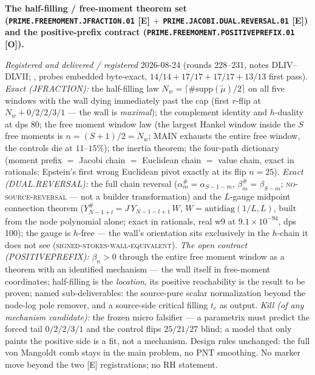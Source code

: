 \par\smallskip\noindent\textbf{The half-filling / free-moment
theorem set (\texttt{PRIME.FREEMOMENT.\allowbreak JFRACTION.01}
[E] $+$ \texttt{PRIME.JACOBI.DUAL.\allowbreak REVERSAL.01} [E])
and the positive-prefix contract
(\texttt{PRIME.FREEMOMENT.\allowbreak POSITIVEPREFIX.01} [O]).}
{\sloppy
\emph{Registered and delivered / registered} 2026-08-24 (rounds
228--231, notes DLIV--DLVII;
, probes
embedded byte-exact, $14/14 + 17/17 + 17/17 + 13/13$ first
pass).  \emph{Exact (JFRACTION):} the half-filling law $N_w =
\lceil \#\mathrm{supp}(\tilde\mu)/2 \rceil$ on all five windows
with the wall dying immediately past the cap (first $r$-flip at
$N_w + 0/2/2/3/1$ --- the wall is \emph{maximal}); the
complement identity and $h$-duality at dps 80; the free moment
window law (the largest Hankel window inside the $S$ free
moments is $n = (S+1)/2 = N_w$; MAIN exhausts the entire free
window, the controls die at $11$--$15\%$); the inertia theorem;
the four-path dictionary (moment prefix $=$ Jacobi chain $=$
Euclidean chain $=$ value chain, exact in rationals; Epstein's
first wrong Euclidean pivot exactly at its flip $n = 25$).
\emph{Exact (DUAL.REVERSAL):} the full chain reversal
($\alpha^{\#}_m = \alpha_{S-1-m}$, $\beta^{\#}_m =
\beta_{S-m}$; \textsc{no-source-reversal} --- not a builder
transformation) and the $L$-gauge midpoint connection theorem
($Y^{\#}_{N-1+l} = J\,Y_{N-1-l+1}\,W$, $W =
\mathrm{antidiag}(1/L, L)$, built from the node polynomial
alone; exact in rationals, real w9 at $9.1\times10^{-94}$, dps
100); the gauge is $h$-free --- the wall's orientation sits
exclusively in the $h$-chain it does not see
(\textsc{signed-stokes-wall-equivalent}).  \emph{The open
contract (POSITIVEPREFIX):} $\beta_n > 0$ through the entire
free moment window as a theorem with an identified mechanism ---
the wall itself in free-moment coordinates; half-filling is the
\emph{location}, its positive reachability is the result to be
proven; named sub-deliverables: the source-pure scalar
normalization beyond the node-log pole remover, and a
source-side critical filling $t_c$ as output.  \emph{Kill (of
any mechanism candidate):} the frozen micro falsifier --- a
parametrix must predict the forced tail $0/2/2/3/1$ and the
control flips $25/21/27$ blind; a model that only paints the
positive side is a fit, not a mechanism.  Design rules
unchanged: the full von Mangoldt comb stays in the main
problem, no PNT smoothing.  No marker move beyond the two [E]
registrations; no RH statement.\par}


